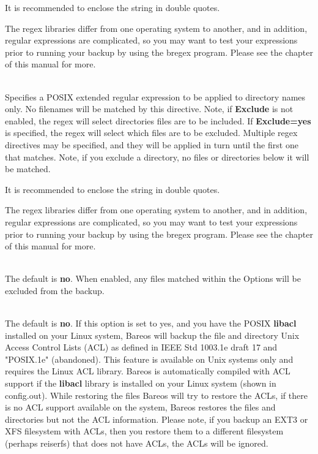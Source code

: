 \begin{description}
   It is recommended to enclose the string in double quotes.

   The regex libraries differ from one operating system to
   another, and in addition, regular expressions are complicated,
   so you may want to test your expressions prior to running your
   backup by using the bregex program. Please see the
    chapter of this manual for
   more.


\item [regexdir={\textless}string{\textgreater}] \hfill \\
   Specifies a POSIX extended regular expression to be applied to directory
   names only.  No filenames will be matched by this directive.  Note, if
   {\bf Exclude} is not enabled, the regex will select directories
   files are to be included.  If {\bf Exclude=yes} is specified, the
   regex will select which files are to be excluded.  Multiple
   regex directives may be specified, and they will be applied in turn
   until the first one that matches.  Note, if you exclude a directory, no
   files or directories below it will be matched.

   It is recommended to enclose the string in double quotes.

   The regex libraries differ from one operating system to
   another, and in addition, regular expressions are complicated,
   so you may want to test your expressions prior to running your
   backup by using the bregex program. Please see the
    chapter of this manual for
   more.


\item [exclude=yes{\textbar}no] \hfill \\
   The default is {\bf no}.  When enabled, any files matched within the
   Options will be excluded from the backup.

\label{ACLSupport}
\item [aclsupport=yes{\textbar}no] \hfill \\
   The default is {\bf no}.  If this option is set to yes, and you have the
   POSIX {\bf libacl} installed on your Linux system, Bareos will backup the
   file and directory Unix Access Control Lists (ACL) as defined in IEEE Std
   1003.1e draft 17 and "POSIX.1e" (abandoned).  This feature is
   available on Unix systems only and requires the Linux ACL library. Bareos is
   automatically compiled with ACL support if the {\bf libacl} library is
   installed on your Linux system (shown in config.out).  While restoring the
   files Bareos will try to restore the ACLs, if there is no ACL support
   available on the system, Bareos restores the files and directories but
   not the ACL information.  Please note, if you backup an EXT3 or XFS
   filesystem with ACLs, then you restore them to a different filesystem
   (perhaps reiserfs) that does not have ACLs, the ACLs will be ignored.


\end{description}
